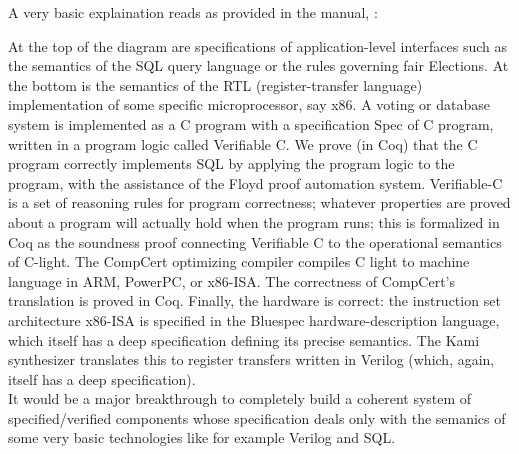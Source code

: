A very basic explaination reads as provided in the manual, :

At the top of the diagram are specifications of application-level interfaces such as the semantics of the SQL query language or the rules governing fair Elections. At the bottom is the semantics of the RTL (register-transfer language) implementation of some specific microprocessor, say x86. A voting or database system is implemented as a C program with a specification Spec of C program, written in a program logic called Verifiable C. We prove (in Coq) that the C program correctly implements SQL by applying the program logic to the program, with the assistance of the Floyd proof automation system. Verifiable-C is a set of reasoning rules for program correctness; whatever properties are proved about a program will actually hold when the program runs; this is formalized in Coq as the soundness proof connecting Verifiable C to the operational semantics of C-light. The CompCert optimizing compiler compiles C light to machine language in ARM, PowerPC, or x86-ISA. The correctness of CompCert's translation is proved in Coq. Finally, the hardware is correct: the instruction set architecture x86-ISA is specified in the Bluespec hardware-description language, which itself has a deep specification defining its precise semantics. The Kami synthesizer translates this to register transfers written in Verilog (which, again, itself has a deep specification).\\

It would be a major breakthrough to completely build a coherent system of specified/verified components whose specification deals only with the semanics of some very basic technologies like for example Verilog and SQL.\\


